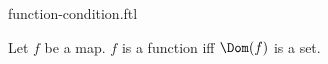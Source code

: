 \documentclass{stex}
\begin{document}
\begin{smodule}{function-condition.ftl}


\begin{fakeforthel}
  \begin{axiom}
    Let $f$ be a map.
    $f$ is a function iff $\Dom(f)$ is a set.
  \end{axiom}
\end{fakeforthel}

\end{smodule}
\end{document}
